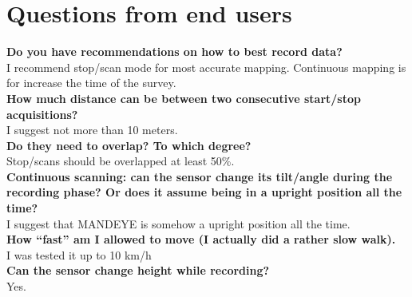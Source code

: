 \chapter{Questions from end users}

\textbf{Do you have recommendations on how to best record data?} \\
I recommend stop/scan mode for most accurate mapping.
Continuous mapping is for increase the time of the survey.  \\
\textbf{How much distance can be between two consecutive start/stop acquisitions?}\\
I suggest not more than 10 meters.\\
\textbf{Do they need to overlap? To which degree?}\\
Stop/scans should be overlapped at least 50\%.\\
\textbf{Continuous scanning: can the sensor change its tilt/angle during the recording phase? 
Or does it assume being in a upright position all the time?} \\
I suggest that MANDEYE  is somehow a upright position all the time. \\
\textbf{How “fast” am I allowed to move (I actually did a rather slow walk).} \\
I was tested it up to 10 km/h\\
\textbf{Can the sensor change height while recording?}\\
Yes.
